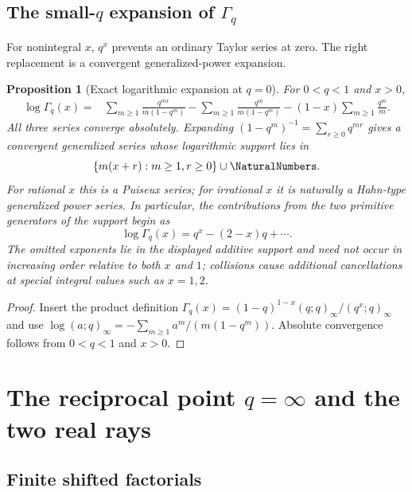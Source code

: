 \documentclass[11pt,oneside]{article}
\newtheorem{proposition}[theorem]{Proposition}
\theoremstyle{definition}
\theoremstyle{remark}
\let\reporttopsection\section
\let\reportsubsection\subsection
\let\chapter\reporttopsection
\let\section\reportsubsection
\begin{document}
\section{The small-\texorpdfstring{$q$}{q} expansion of \texorpdfstring{$\Gamma_q$}{q-gamma}}

For nonintegral $x$, $q^x$ prevents an ordinary Taylor series at zero.  The
right replacement is a convergent generalized-power expansion.

\begin{proposition}[Exact logarithmic expansion at $q=0$]\label{prop:qgamma-zero}
For $0<q<1$ and $x>0$,
\begin{align}
 \log\Gamma_q(x)
 =&\sum_{m\ge1}\frac{q^{mx}}{m(1-q^m)}
 -\sum_{m\ge1}\frac{q^m}{m(1-q^m)}
 -(1-x)\sum_{m\ge1}\frac{q^m}{m}.                 \label{eq:qgamma-zero-log}
\end{align}
All three series converge absolutely.  Expanding
$(1-q^m)^{-1}=\sum_{r\ge0}q^{mr}$ gives a convergent generalized series whose
logarithmic support lies in
\[
 \{m(x+r):m\ge1,r\ge0\}\cup\NaturalNumbers.
\]
For rational $x$ this is a Puiseux series; for irrational $x$ it is naturally
a Hahn-type generalized power series.  In particular, the contributions from the two primitive generators of the
support begin as
\[
 \log\Gamma_q(x)=q^x-(2-x)q+\cdots.
\]
The omitted exponents lie in the displayed additive support and need not occur
in increasing order relative to both $x$ and $1$; collisions cause additional
cancellations at special integral values such as $x=1,2$.
\end{proposition}

\begin{proof}
Insert the product definition
\(
\Gamma_q(x)=(1-q)^{1-x}(q;q)_\infty/(q^x;q)_\infty
\)
and use
\(
\log(a;q)_\infty=-\sum_{m\ge1}a^m/(m(1-q^m)).
\)
Absolute convergence follows from $0<q<1$ and $x>0$.
\end{proof}

\chapter{The reciprocal point \texorpdfstring{$q=\infty$}{q = infinity} and the two real rays}\label{chap:infinity}

\section{Finite shifted factorials}
\end{document}
